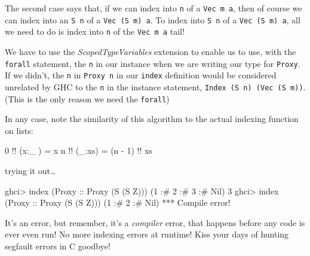 \documentclass[]{article}
\newenvironment{Shaded}{}{}
\newcommand{\DataTypeTok}[1]{\textcolor[rgb]{0.56,0.13,0.00}{#1}}
\newcommand{\DecValTok}[1]{\textcolor[rgb]{0.25,0.63,0.44}{#1}}
\newcommand{\OtherTok}[1]{\textcolor[rgb]{0.00,0.44,0.13}{#1}}
\newcommand{\FunctionTok}[1]{\textcolor[rgb]{0.02,0.16,0.49}{#1}}
\newcommand{\NormalTok}[1]{#1}
\begin{document}
The second case says that, if we can index into \texttt{n} of a
\texttt{Vec\ m\ a}, then of course we can index into an \texttt{S\ n} of a
\texttt{Vec\ (S\ m)\ a}. To index into \texttt{S\ n} of a
\texttt{Vec\ (S\ m)\ a}, all we need to do is index into \texttt{n} of the
\texttt{Vec\ m\ a} tail!

We have to use the \emph{ScopedTypeVariables} extension to enable us to use,
with the \texttt{forall} statement, the \texttt{n} in our instance when we are
writing our type for \texttt{Proxy}. If we didn't, the \texttt{n} in
\texttt{Proxy\ n} in our \texttt{index} definition would be considered unrelated
by GHC to the \texttt{n} in the instance statement,
\texttt{Index\ (S\ n)\ (Vec\ (S\ m))}. (This is the only reason we need the
\texttt{forall})

In any case, note the similarity of this algorithm to the actual indexing
function on lists:

\begin{Shaded}
\begin{Highlighting}[]
\DecValTok{0} \FunctionTok{!!}\NormalTok{ (x}\FunctionTok{:}\NormalTok{_ ) }\FunctionTok{=}\NormalTok{ x}
\NormalTok{n }\FunctionTok{!!}\NormalTok{ (_}\FunctionTok{:}\NormalTok{xs) }\FunctionTok{=}\NormalTok{ (n }\FunctionTok{-} \DecValTok{1}\NormalTok{) }\FunctionTok{!!}\NormalTok{ xs}
\end{Highlighting}
\end{Shaded}

trying it out\ldots{}

\begin{Shaded}
\begin{Highlighting}[]
\NormalTok{ghci}\FunctionTok{>}\NormalTok{ index (}\DataTypeTok{Proxy}\OtherTok{ ::} \DataTypeTok{Proxy}\NormalTok{ (}\DataTypeTok{S}\NormalTok{ (}\DataTypeTok{S} \DataTypeTok{Z}\NormalTok{))) (}\DecValTok{1} \FunctionTok{:#} \DecValTok{2} \FunctionTok{:#} \DecValTok{3} \FunctionTok{:#} \DataTypeTok{Nil}\NormalTok{)}
\DecValTok{3}
\NormalTok{ghci}\FunctionTok{>}\NormalTok{ index (}\DataTypeTok{Proxy}\OtherTok{ ::} \DataTypeTok{Proxy}\NormalTok{ (}\DataTypeTok{S}\NormalTok{ (}\DataTypeTok{S} \DataTypeTok{Z}\NormalTok{))) (}\DecValTok{1} \FunctionTok{:#} \DecValTok{2} \FunctionTok{:#} \DataTypeTok{Nil}\NormalTok{)}
\FunctionTok{***} \DataTypeTok{Compile}\NormalTok{ error}\FunctionTok{!}
\end{Highlighting}
\end{Shaded}

It's an error, but remember, it's a \emph{compiler} error, that happens before
any code is ever even run! No more indexing errors at runtime! Kiss your days of
hunting segfault errors in C goodbye!
\end{document}
